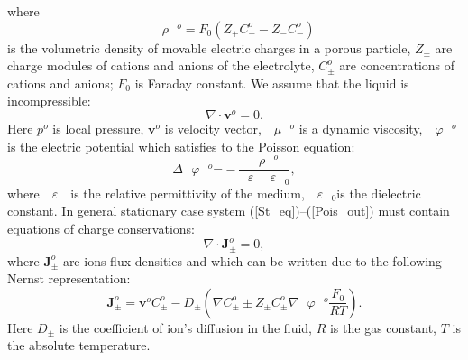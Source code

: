 \documentclass{amsart}
\begin{document}
where
\begin{equation}\label{ro}
{{\text{ }\!\!\rho\!\!\text{ }}^{o}}={{F}_{0}}\left( {{Z}_{+}}C_{+}^{o}-{{Z}_{-}}C_{-}^{o} \right)
\end{equation}	
is the  volumetric density of movable electric charges in a porous particle,  ${{Z}_{\pm }}$ are charge modules of cations and anions of the electrolyte, $C_{\pm }^{o}$ are concentrations of cations and anions; ${{F}_{0}}$ is Faraday constant.
 We assume that the liquid is incompressible:
 \begin{equation}\label{divvo}
\nabla \cdot {{\mathbf{v}}^{o}}=0.																														
\end{equation}
Here ${{p}^{o}}$ is local pressure, ${{\mathbf{v}}^{o}}$ is velocity vector, ${{\text{ }\!\!\mu\!\!\text{ }}^{o}}$ is a dynamic viscosity, ${{\text{ }\!\!\varphi\!\!\text{ }}^{o}}$ is the electric potential which satisfies to the Poisson equation:
\begin{equation}\label{Pois_out}
\Delta {{\text{ }\!\!\varphi\!\!\text{ }}^{o}}\text{=}-\frac{{{\text{ }\!\!\rho\!\!\text{ }}^{o}}}{\text{ }\!\!\varepsilon\!\!\text{ }{{\text{ }\!\!\varepsilon\!\!\text{ }}_{0}}},
\end{equation}																													
where $\text{ }\!\!\varepsilon\!\!\text{ }$ is the  relative  permittivity of the medium, ${{\text{ }\!\!\varepsilon\!\!\text{ }}_{0}}$is the dielectric constant.
In general stationary case system (\ref{St_eq})--(\ref{Pois_out}) must contain equations of charge conservations:
\begin{equation}\label{J}
\nabla \cdot \mathbf{J}_{\pm }^{o}=0,
\end{equation}																													
where $\mathbf{J}_{\pm }^{o}$ are ions flux densities and which can be written due to  the following Nernst representation:
$$\mathbf{J}_{\pm }^{o}={{\mathbf{v}}^{o}}C_{\pm }^{o}-{{D}_{\pm }}\left( \nabla C_{\pm }^{o}\pm {{Z}_{\pm }}C_{\pm }^{o}\nabla {{\text{ }\!\!\varphi\!\!\text{ }}^{o}}\frac{{{F}_{0}}}{RT} \right).$$																		
Here ${{D}_{\pm }}$ is the coefficient of ion's diffusion in the fluid, $R$ is the gas constant, $T$ is the absolute temperature.
\end{document}
